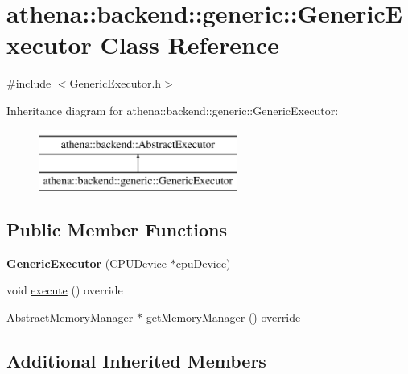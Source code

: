 \hypertarget{classathena_1_1backend_1_1generic_1_1_generic_executor}{}\section{athena\+:\+:backend\+:\+:generic\+:\+:Generic\+Executor Class Reference}
\label{classathena_1_1backend_1_1generic_1_1_generic_executor}


{\ttfamily \#include $<$Generic\+Executor.\+h$>$}

Inheritance diagram for athena\+:\+:backend\+:\+:generic\+:\+:Generic\+Executor\+:\begin{figure}[H]
\begin{center}
\leavevmode
\includegraphics[height=2.000000cm]{d8/d09/classathena_1_1backend_1_1generic_1_1_generic_executor}
\end{center}
\end{figure}
\subsection*{Public Member Functions}
\begin{DoxyCompactItemize}
\item 
\mbox{\label{classathena_1_1backend_1_1generic_1_1_generic_executor_a1261a552f5a1168a34bf31ecefdcaead}} 
{\bfseries Generic\+Executor} (\mbox{\hyperlink{classathena_1_1backend_1_1generic_1_1_c_p_u_device}{C\+P\+U\+Device}} $\ast$cpu\+Device)
\item 
void \mbox{\hyperlink{classathena_1_1backend_1_1generic_1_1_generic_executor_a38b56c284050d31198b28fcb6595bc73}{execute}} () override
\item 
\mbox{\hyperlink{classathena_1_1backend_1_1_abstract_memory_manager}{Abstract\+Memory\+Manager}} $\ast$ \mbox{\hyperlink{classathena_1_1backend_1_1generic_1_1_generic_executor_a0560a1dfc0c70ebef0b5be26bb82b9c5}{get\+Memory\+Manager}} () override
\end{DoxyCompactItemize}
\subsection*{Additional Inherited Members}


